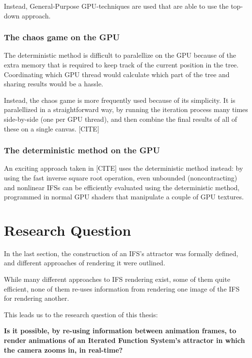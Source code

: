 \documentclass[11pt]{article}
\begin{document}
Instead, General-Purpose GPU-techniques are used that are able to use the top-down approach.

\subsubsection{The chaos game on the GPU}
\label{sec:orgc099e97}
\label{subsection:chaos_game_gpu}

The deterministic method is difficult to paralellize on the GPU because of the extra memory that is required to keep track of the current position in the tree.
Coordinating which GPU thread would calculate which part of the tree and sharing results would be a hassle.

Instead, the chaos game is more frequently used because of its simplicity. It is paralellized in a straightforward way, by running the iteration process many times side-by-side (one per GPU thread),
and then combine the final results of all of these on a single canvas. [CITE]

\subsubsection{The deterministic method on the GPU}
\label{sec:orgdd6db12}
\label{subsection:deterministic_gpu}

An exciting approach taken in [CITE] uses the deterministic method instead:
by using the fast inverse square root operation, even unbounded (noncontracting) and nonlinear IFSs can be efficiently
evaluated using the deterministic method, programmed in normal GPU shaders that manipulate a couple of GPU textures.


\section{Research Question}
\label{sec:org184af1e}
\label{section:research_question}

In the last section, the construction of an IFS's attractor was formally defined, 
and different approaches of rendering it were outlined.

While many different approaches to IFS rendering exist, some of them quite efficient,
none of them re-uses information from rendering one image of the IFS for rendering another.

This leads us to the research question of this thesis:

\textbf{\textbf{Is it possible, by re-using information between animation frames, to render animations of an Iterated Function System's attractor in which the camera zooms in, in real-time?}}
\end{document}
